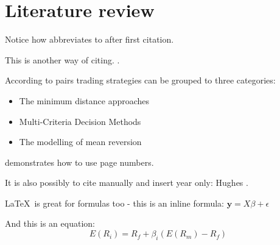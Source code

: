 \section{Literature review}

Notice how \textcite{focardiNewApproachStatistical2016} abbreviates to
\textcite{focardiNewApproachStatistical2016} after first citation.

This is another way of citing. \parencite[110]{focardiNewApproachStatistical2016}. 

According to \textcite{huckPairsTradingSelection2015} pairs trading strategies can be grouped to three categories:
\vspace{-5mm}
\begin{itemize}[noitemsep]
  \item The minimum distance approaches
  \item Multi-Criteria Decision Methods
  \item The modelling of mean reversion 
\end{itemize}

\textcite[57-62]{focardiNewApproachStatistical2016} demonstrates how to use page numbers.

It is also possibly to cite manually and insert year only: Hughes
\parencite*{huckPairsTradingOutranking2010}.


\LaTeX \ is great for formulas too - this is an inline formula: $\textbf{y} = X\beta  +
\epsilon $

And this is an equation: \\
\begin{equation}
  E(R_i) =  R_f + \beta_i (E(R_m) - R_f)
\end{equation}